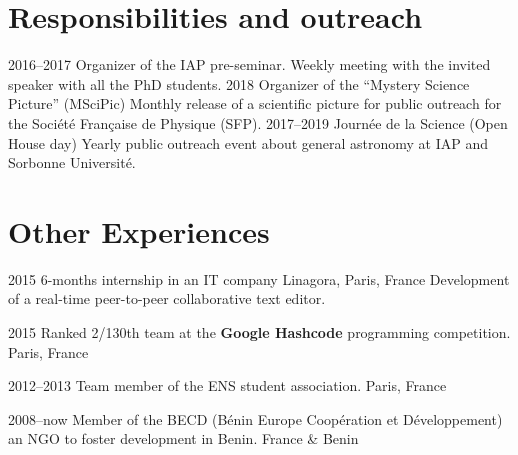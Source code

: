 \documentclass[]{cv-style}
\begin{document}
\newpage
\section{Responsibilities and outreach}
\begin{entrylist}
\entrynohl
{2016--2017}
{Organizer of the IAP pre-seminar.}
{}
{Weekly meeting with the invited speaker with all the PhD students.}
\entrynohl
{2018}
{Organizer of the ``Mystery Science Picture'' (MSciPic)}
{}
{Monthly release of a scientific picture for public outreach for the Société Française de Physique (SFP).}
\entrynohl
{2017--2019}
{Journée de la Science (Open House day)}
{}
{Yearly public outreach event about general astronomy at IAP and Sorbonne Université.}
\end{entrylist}


\section{Other Experiences}

\begin{entrylist}
\entrynohl
{2015}
{6-months internship in an IT company}
{Linagora, Paris, France}
{Development of a real-time peer-to-peer collaborative text editor.}

\vspace{1em}

\entryshortnohl
{2015}
{Ranked 2/130th team at the \textbf{Google Hashcode} programming competition.}
{Paris, France}

\entryshortnohl
{2012--2013}
{Team member of the ENS student association.}
{Paris, France}

\entryshortnohl
{2008--now}
{Member of the BECD (Bénin Europe Coopération et Développement) an NGO to foster development in Benin.}
{France \& Benin}

\end{entrylist}
\end{document}
